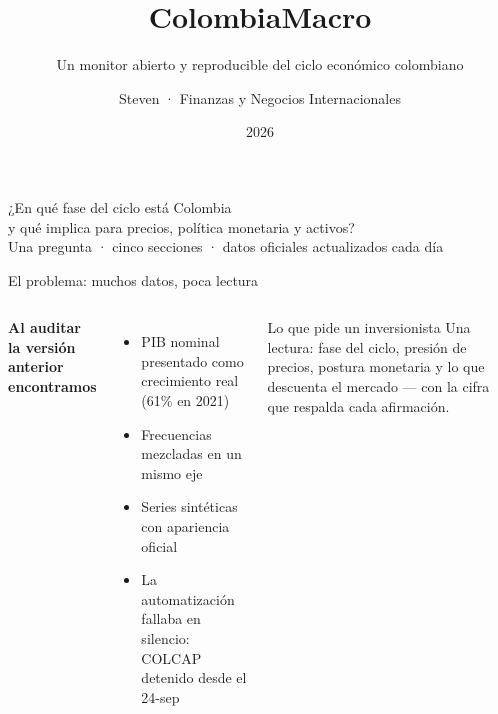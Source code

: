 \documentclass[aspectratio=169,11pt]{beamer}
\title{ColombiaMacro}
\subtitle{Un monitor abierto y reproducible del ciclo económico colombiano}
\author{Steven · Finanzas y Negocios Internacionales}
\institute{Universidad de San Buenaventura Cali}
\date{2026}
\begin{document}
\maketitle

\begin{frame}[plain,c]
\centering
{\Large ¿En qué fase del ciclo está Colombia}\\[0.4em]
{\Large y qué implica para precios, política monetaria y activos?}\\[1.6em]
{\color{cmmuted} Una pregunta · cinco secciones · datos oficiales actualizados cada día}
\end{frame}

\begin{frame}{El problema: muchos datos, poca lectura}
\begin{columns}[T]
\textbf{Al auditar la versión anterior encontramos}
\begin{itemize}
\item \alert{PIB nominal} presentado como crecimiento real (61\% en 2021)
\item Frecuencias mezcladas en un mismo eje
\item Series sintéticas con apariencia oficial
\item La automatización fallaba en silencio: COLCAP detenido desde el 24-sep
\end{itemize}
\begin{block}{Lo que pide un inversionista}
Una lectura: fase del ciclo, presión de precios, postura monetaria y lo que descuenta el mercado — con la cifra que respalda cada afirmación.
\end{block}
\end{columns}
\end{frame}
\end{document}
